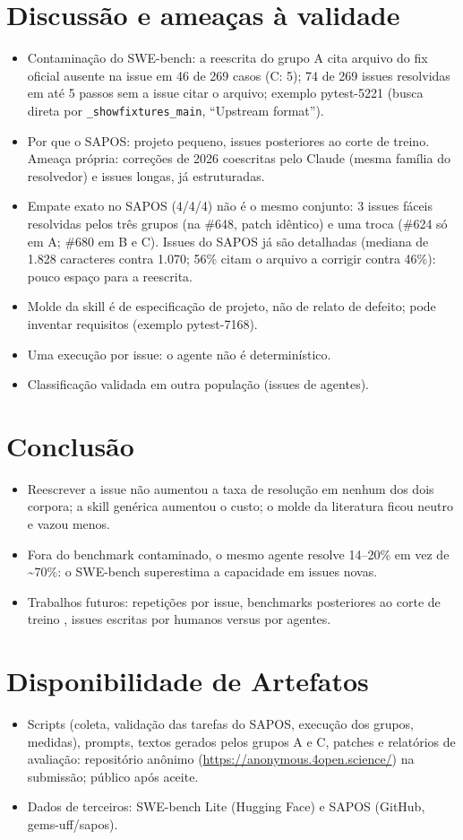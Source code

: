 \documentclass[sigconf]{acmart}
\newcommand{\topicos}[1]{{\color{gray}\begin{itemize}\setlength\itemsep{0pt}#1\end{itemize}}}
\begin{document}
\section{Discussão e ameaças à validade}
\topicos{
\item Contaminação do SWE-bench: a reescrita do grupo A cita arquivo do fix oficial ausente na issue em 46 de 269 casos (C: 5); 74 de 269 issues resolvidas em até 5 passos sem a issue citar o arquivo; exemplo pytest-5221 (busca direta por \texttt{\_showfixtures\_main}, ``Upstream format'').
\item Por que o SAPOS: projeto pequeno, issues posteriores ao corte de treino. Ameaça própria: correções de 2026 coescritas pelo Claude (mesma família do resolvedor) e issues longas, já estruturadas.
\item Empate exato no SAPOS (4/4/4) não é o mesmo conjunto: 3 issues fáceis resolvidas pelos três grupos (na \#648, patch idêntico) e uma troca (\#624 só em A; \#680 em B e C). Issues do SAPOS já são detalhadas (mediana de 1.828 caracteres contra 1.070; 56\% citam o arquivo a corrigir contra 46\%): pouco espaço para a reescrita.
\item Molde da skill é de especificação de projeto, não de relato de defeito; pode inventar requisitos (exemplo pytest-7168).
\item Uma execução por issue: o agente não é determinístico.
\item Classificação validada em outra população (issues de agentes).
}

\section{Conclusão}
\topicos{
\item Reescrever a issue não aumentou a taxa de resolução em nenhum dos dois corpora; a skill genérica aumentou o custo; o molde da literatura ficou neutro e vazou menos.
\item Fora do benchmark contaminado, o mesmo agente resolve 14--20\% em vez de \textasciitilde70\%: o SWE-bench superestima a capacidade em issues novas.
\item Trabalhos futuros: repetições por issue, benchmarks posteriores ao corte de treino \cite{badertdinov2025swerebench,zhang2025swebenchlive}, issues escritas por humanos versus por agentes.
}

\section*{Disponibilidade de Artefatos}
\topicos{
\item Scripts (coleta, validação das tarefas do SAPOS, execução dos grupos, medidas), prompts, textos gerados pelos grupos A e C, patches e relatórios de avaliação: repositório anônimo (\url{https://anonymous.4open.science/}) na submissão; público após aceite.
\item Dados de terceiros: SWE-bench Lite (Hugging Face) e SAPOS (GitHub, gems-uff/sapos).
}
\end{document}

